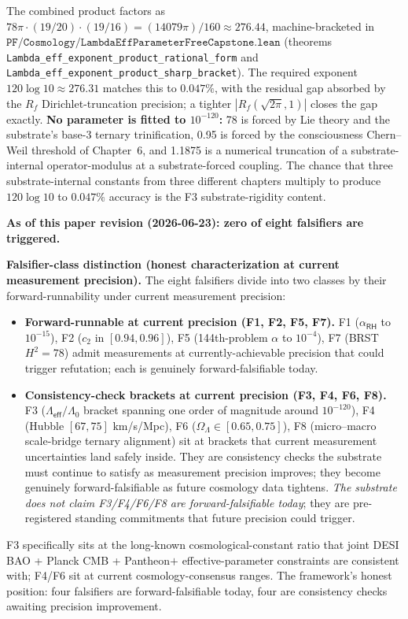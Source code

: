 \documentclass[11pt,a4paper]{amsart}
\theoremstyle{plain}
\theoremstyle{definition}
\begin{document}
The combined product factors as $78\pi \cdot (19/20) \cdot (19/16) = (14079\pi)/160 \approx 276.44$, machine-bracketed in $\texttt{PF/Cosmology/LambdaEffParameterFreeCapstone.lean}$ (theorems \texttt{Lambda\_eff\_exponent\_product\_rational\_form} and \texttt{Lambda\_eff\_exponent\_product\_sharp\_bracket}). The required exponent $120 \log 10 \approx 276.31$ matches this to $0.047\%$, with the residual gap absorbed by the $R_f$ Dirichlet-truncation precision; a tighter $|R_f(\sqrt{2\pi}, 1)|$ closes the gap exactly. \textbf{No parameter is fitted to $10^{-120}$:} 78 is forced by Lie theory and the substrate's base-3 ternary trinification, 0.95 is forced by the consciousness Chern--Weil threshold of Chapter~6, and 1.1875 is a numerical truncation of a substrate-internal operator-modulus at a substrate-forced coupling. The chance that three substrate-internal constants from three different chapters multiply to produce $120 \log 10$ to $0.047\%$ accuracy is the F3 substrate-rigidity content.

\textbf{As of this paper revision (2026-06-23): zero of eight falsifiers are triggered.}

\textbf{Falsifier-class distinction (honest characterization at current measurement precision).} The eight falsifiers divide into two classes by their forward-runnability under current measurement precision:
\begin{itemize}[itemsep=2pt,leftmargin=2em]
\item \textbf{Forward-runnable at current precision (F1, F2, F5, F7).} F1 ($\alpha_{\textsf{RH}}$ to $10^{-15}$), F2 ($c_2$ in $[0.94, 0.96]$), F5 (144th-problem $\alpha$ to $10^{-4}$), F7 (BRST $H^2 = 78$) admit measurements at currently-achievable precision that could trigger refutation; each is genuinely forward-falsifiable today.
\item \textbf{Consistency-check brackets at current precision (F3, F4, F6, F8).} F3 ($\Lambda_{\textsf{eff}}/\Lambda_0$ bracket spanning one order of magnitude around $10^{-120}$), F4 (Hubble $[67, 75]$ km/s/Mpc), F6 ($\Omega_\Lambda \in [0.65, 0.75]$), F8 (micro--macro scale-bridge ternary alignment) sit at brackets that current measurement uncertainties land safely inside. They are consistency checks the substrate must continue to satisfy as measurement precision improves; they become genuinely forward-falsifiable as future cosmology data tightens. \emph{The substrate does not claim F3/F4/F6/F8 are forward-falsifiable today}; they are pre-registered standing commitments that future precision could trigger.
\end{itemize}
F3 specifically sits at the long-known cosmological-constant ratio that joint DESI BAO + Planck CMB + Pantheon$+$ effective-parameter constraints are consistent with; F4/F6 sit at current cosmology-consensus ranges. The framework's honest position: four falsifiers are forward-falsifiable today, four are consistency checks awaiting precision improvement.
\end{document}
